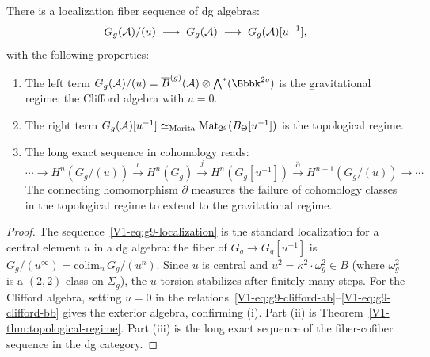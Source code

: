 \begin{theorem}
There is a localization fiber sequence of dg algebras:
\begin{equation}%
G_g(\cA)/(u)
\;\longrightarrow\;
G_g(\cA)
\;\longrightarrow\;
G_g(\cA)[u^{-1}],
\end{equation}
with the following properties:
\begin{enumerate}[label=\textup{(\roman*)}]
\item The left term $G_g(\cA)/(u) = \barB^{(g)}(\cA) \otimes
\bigwedge^*(\Bbbk^{2g})$ is the gravitational regime:
the Clifford algebra with $u = 0$.

\item The right term $G_g(\mathcal{A})[u^{-1}] \simeq_{\mathrm{Morita}}
\mathrm{Mat}_{2^g}(B_\Theta[u^{-1}])$ is the topological regime.

\item The long exact sequence in cohomology reads:
\begin{equation}%
\cdots \to
H^n(G_g/(u)) \xrightarrow{\iota}
H^n(G_g) \xrightarrow{j}
H^n(G_g[u^{-1}]) \xrightarrow{\partial}
H^{n+1}(G_g/(u)) \to \cdots
\end{equation}
The connecting homomorphism $\partial$ measures the failure of
cohomology classes in the topological regime to extend to the
gravitational regime.
\end{enumerate}
\end{theorem}

\begin{proof}
The sequence~\eqref{V1-eq:g9-localization} is the standard localization
for a central element $u$ in a dg algebra: the fiber of
$G_g \to G_g[u^{-1}]$ is $G_g/(u^\infty) = \mathrm{colim}_n\,
G_g/(u^n)$. Since $u$ is central and $u^2 = \kappa^2 \cdot \omega_g^2
\in B$ (where $\omega_g^2$ is a $(2,2)$-class on $\Sigma_g$), the
$u$-torsion stabilizes after finitely many steps. For the Clifford
algebra, setting $u = 0$ in the
relations~\eqref{V1-eq:g9-clifford-ab}--\eqref{V1-eq:g9-clifford-bb} gives
the exterior algebra, confirming (i). Part (ii) is
Theorem~\ref{V1-thm:topological-regime}. Part (iii) is the long exact
sequence of the fiber-cofiber sequence in the dg category.
\end{proof}


